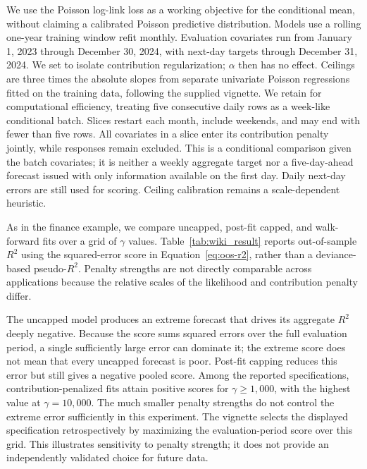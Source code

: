 \documentclass[article,shortnames,nofooter]{jss}
\begin{document}
We use the Poisson log-link loss as a working objective for the conditional mean, without claiming a calibrated Poisson predictive distribution. Models use a rolling one-year training window refit monthly. Evaluation covariates run from January 1, 2023 through December 30, 2024, with next-day targets through December 31, 2024. We set  to isolate contribution regularization; $\alpha$ then has no effect. Ceilings are three times the absolute slopes from separate univariate Poisson regressions fitted on the training data, following the supplied vignette. We retain  for computational efficiency, treating five consecutive daily rows as a week-like conditional batch. Slices restart each month, include weekends, and may end with fewer than five rows. All covariates in a slice enter its contribution penalty jointly, while responses remain excluded. This is a conditional comparison given the batch covariates; it is neither a weekly aggregate target nor a five-day-ahead forecast issued with only information available on the first day. Daily next-day errors are still used for scoring. Ceiling calibration remains a scale-dependent heuristic.

As in the finance example, we compare uncapped, post-fit capped, and walk-forward fits over a grid of $\gamma$ values. Table~\ref{tab:wiki_result} reports out-of-sample $R^2$ using the squared-error score in Equation~\ref{eq:oos-r2}, rather than a deviance-based pseudo-$R^2$. Penalty strengths are not directly comparable across applications because the relative scales of the likelihood and contribution penalty differ.

\begin{table}[h]
    \centering
    
    \caption{Pooled out-of-sample $R^2$ from the backtest experiment (January 2023 to December 2024) on the Wikipedia pageview dataset. The uncapped score is dominated by a single extreme out-of-sample prediction. The likelihood and penalty have different relative scales from the finance application. In the reported grid, scores become positive for $\gamma\geq1{,}000$.}
    \label{tab:wiki_result}
\end{table}

The uncapped model produces an extreme forecast that drives its aggregate $R^2$ deeply negative. Because the score sums squared errors over the full evaluation period, a single sufficiently large error can dominate it; the extreme score does not mean that every uncapped forecast is poor. Post-fit capping reduces this error but still gives a negative pooled score. Among the reported specifications, contribution-penalized fits attain positive scores for $\gamma\geq1{,}000$, with the highest value at $\gamma=10{,}000$. The much smaller penalty strengths do not control the extreme error sufficiently in this experiment. The vignette selects the displayed specification retrospectively by maximizing the evaluation-period score over this grid. This illustrates sensitivity to penalty strength; it does not provide an independently validated choice for future data.
\end{document}
